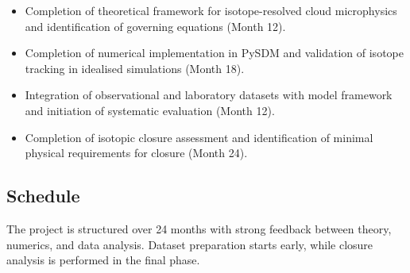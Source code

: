 \documentclass[11pt]{article}
\begin{document}
\begin{itemize}
\item[\textbf{M1}] Completion of theoretical framework for isotope-resolved cloud microphysics
and identification of governing equations (Month 12).

\item[\textbf{M2}] Completion of numerical implementation in PySDM and validation of isotope tracking
in idealised simulations (Month 18).

\item[\textbf{M3}] Integration of observational and laboratory datasets with model framework
and initiation of systematic evaluation (Month 12).

\item[\textbf{M4}] Completion of isotopic closure assessment and identification of minimal physical
requirements for closure (Month 24).

\end{itemize}

\subsection*{Schedule}
The project is structured over 24 months with strong feedback between theory,
numerics, and data analysis. Dataset preparation starts early, while closure
analysis is performed in the final phase.
\end{document}
